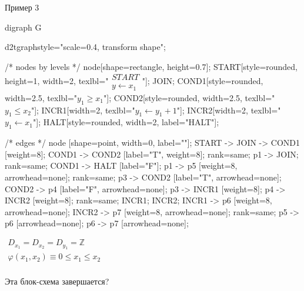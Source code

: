 \documentclass[hyperref={unicode=true}]{beamer}
\begin{document}
    \begin{frame}[fragile]{Пример 3}
    \begin{multicols}{2}
	\huge
	\begin{dot2tex}[options=-traw]
	digraph G{
		d2tgraphstyle="scale=0.4, transform shape";

		/* nodes by levels */
		node[shape=rectangle, height=0.7];
		START[style=rounded, height=1, width=2, texlbl="$\begin{matrix}START\\ y \leftarrow x_1\end{matrix}$"];
		JOIN;
        COND1[style=rounded, width=2.5, texlbl="$y_1 \geq x_1$"];
        COND2[style=rounded, width=2.5, texlbl="$y_1 \leq x_2$"];
		INCR1[width=2, texlbl="$y_1 \leftarrow y_1 + 1$"];
		INCR2[width=2, texlbl="$y_1 \leftarrow x_1$"];
        HALT[style=rounded, width=2, label="HALT"];

		/* edges */
		node [shape=point, width=0, label=""];
		START -> JOIN -> COND1 [weight=8];
        COND1 -> COND2 [label="T", weight=8];
		{ rank=same; p1 -> JOIN; }
        { rank=same; COND1 -> HALT [label="F"]; }
		p1 -> p5 [weight=8, arrowhead=none];
		{ rank=same; p3 -> COND2 [label="T", arrowhead=none]; COND2 -> p4 [label="F", arrowhead=none]; }
		p3 -> INCR1 [weight=8];
		p4 -> INCR2 [weight=8];
		{ rank=same; INCR1; INCR2; }
		INCR1 -> p6 [weight=8, arrowhead=none];
		INCR2 -> p7 [weight=8, arrowhead=none];
		{ rank=same; p5 -> p6 [arrowhead=none]; p6 -> p7 [arrowhead=none]; }
        }
	\end{dot2tex}

	\normalsize

    $\begin{matrix}
    D_{x_1} = D_{x_2} = D_{y_1} = \mathbb{Z}\\
    \varphi(x_1, x_2) \equiv 0 \leq x_1 \leq x_2\\
    \end{matrix}$

    Эта блок-схема завершается?
    \end{multicols}
    \end{frame}
\end{document}
